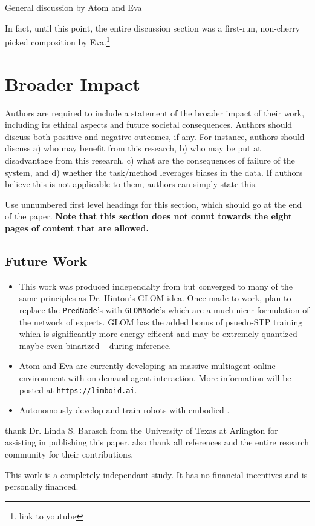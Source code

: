 General discussion by Atom and Eva

In fact, until this point, the entire discussion section was a first-run, non-cherry picked composition by Eva.\footnote{link to youtube}

\section*{Broader Impact}

Authors are required to include a statement of the broader impact of their work, including its ethical aspects and future societal consequences. 
Authors should discuss both positive and negative outcomes, if any. For instance, authors should discuss a) 
who may benefit from this research, b) who may be put at disadvantage from this research, c) what are the consequences of failure of the system, and d) whether the task/method leverages
biases in the data. If authors believe this is not applicable to them, authors can simply state this.

Use unnumbered first level headings for this section, which should go at the end of the paper. {\bf Note that this section does not count towards the eight pages of content that are allowed.}

\subsection*{Future Work}

\begin{itemize}
\item This work was produced independalty from but converged to many of the same principles as Dr. Hinton's GLOM idea. Once made to work, \we plan to replace the \verb|PredNode|'s with \verb|GLOMNode|'s which are a much nicer formulation of the network of experts. GLOM has the added bonus of psuedo-STP training which is significantly more energy efficent and may be extremely quantized -- maybe even binarized -- during inference.
\item Atom and Eva are currently developing an massive multiagent online environment with on-demand \PGI agent interaction. More information will be posted at \texttt{https://limboid.ai}.
\item Autonomously develop and train robots with embodied \PGI.
\end{itemize}


\begin{ack}
\We thank Dr. Linda S. Barasch from the University of Texas at Arlington for assisting in publishing this paper. \We also thank all \our references and the entire research community for their contributions. 

This work is a completely independant study. It has no financial incentives and is personally financed.
\end{ack} 
